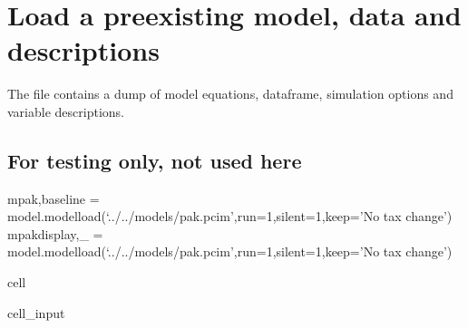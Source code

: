 \documentclass[letterpaper,10pt,english]{jupyterBook}
\begin{document}
\section{Load a pre\sphinxhyphen{}existing model, data and descriptions}
\label{\detokenize{content/howto/modifymodel/create_real_model:load-a-pre-existing-model-data-and-descriptions}}
\sphinxAtStartPar
The file  contains a dump of model equations, dataframe, simulation options and variable descriptions.


\subsection{For testing only, not used here}
\label{\detokenize{content/howto/modifymodel/create_real_model:for-testing-only-not-used-here}}
\sphinxAtStartPar
mpak,baseline = model.modelload(‘../../models/pak.pcim’,run=1,silent=1,keep=’No tax change’)
mpakdisplay,\_ = model.modelload(‘../../models/pak.pcim’,run=1,silent=1,keep=’No tax change’)

\begin{sphinxuseclass}{cell}\begin{sphinxVerbatimInput}

\begin{sphinxuseclass}{cell_input}
\begin{sphinxVerbatim}[commandchars=\\\{\}]
  
  
\end{sphinxVerbatim}

\end{sphinxuseclass}\end{sphinxVerbatimInput}

\end{sphinxuseclass}
\end{document}
